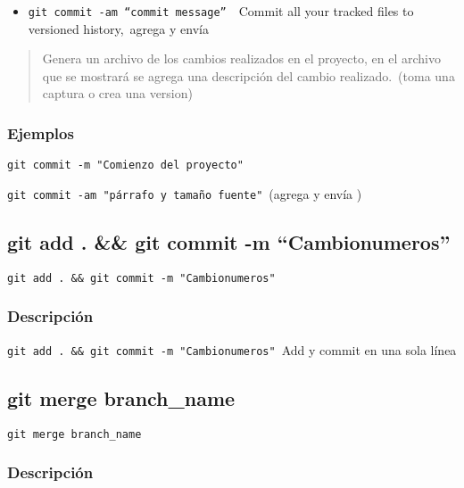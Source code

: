 \documentclass[
  a2paper,
]{article}
\providecommand{\tightlist}{%
  \setlength{\itemsep}{0pt}\setlength{\parskip}{0pt}}\usepackage{longtable,booktabs,array}
\begin{document}
\begin{itemize}
\tightlist
\item
  \texttt{git\ commit\ -am\ “commit\ message”}~~Commit all your tracked
  files to versioned history,~agrega y envía
\end{itemize}

\begin{quote}
Genera un archivo de los cambios realizados en el proyecto, en el
archivo que se mostrará se agrega una descripción del cambio
realizado.~(toma una captura o crea una version)
\end{quote}

\hypertarget{ejemplos-3}{%
\subsubsection{Ejemplos}\label{ejemplos-3}}

\texttt{git\ commit\ -m\ "Comienzo\ del\ proyecto"}

\texttt{git\ commit\ -am\ "párrafo\ y\ tamaño\ fuente"}~(agrega y envía
)

\hypertarget{git-add-.-git-commit--m-cambionumeros}{%
\subsection{git add . \&\& git commit -m
``Cambionumeros''}\label{git-add-.-git-commit--m-cambionumeros}}

\texttt{git\ add\ .\ \&\&\ git\ commit\ -m\ "Cambionumeros"}

\hypertarget{descripciuxf3n}{%
\subsubsection{Descripción}\label{descripciuxf3n}}

\texttt{git\ add\ .\ \&\&\ git\ commit\ -m\ "Cambionumeros"}~Add y
commit en una sola línea

\hypertarget{git-merge-branch_name}{%
\subsection{git merge branch\_name}\label{git-merge-branch_name}}

\texttt{git\ merge\ branch\_name}

\hypertarget{descripciuxf3n-1}{%
\subsubsection{Descripción}\label{descripciuxf3n-1}}
\end{document}
